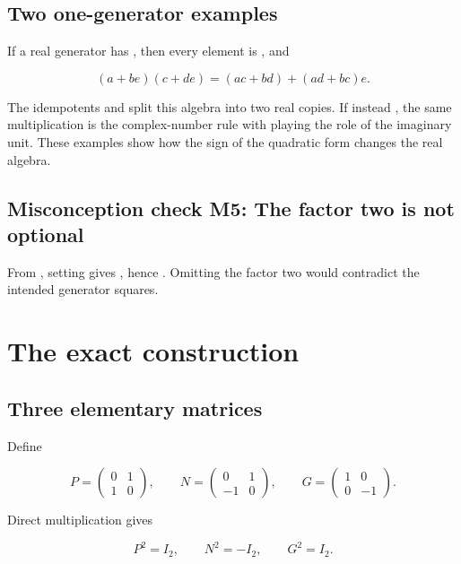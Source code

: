 \documentclass[11pt]{article}
\begin{document}
\subsection{Two one-generator examples}

If a real generator \texttt{} has \texttt{}, then every element is \texttt{}, and

\[
(a+be)(c+de)=(ac+bd)+(ad+bc)e.
\]

The idempotents \texttt{} and \texttt{} split this algebra into two real copies. If instead \texttt{}, the same multiplication is the complex-number rule with \texttt{} playing the role of the imaginary unit. These examples show how the sign of the quadratic form changes the real algebra.

\subsection{Misconception check M5: The factor two is not optional}

From \texttt{}, setting \texttt{} gives \texttt{}, hence \texttt{}. Omitting the factor two would contradict the intended generator squares.

\section{The exact \texttt{} construction}

\subsection{Three elementary matrices}

Define

\[
P=\begin{pmatrix}0&1\\1&0\end{pmatrix},
\qquad
N=\begin{pmatrix}0&1\\-1&0\end{pmatrix},
\qquad
G=\begin{pmatrix}1&0\\0&-1\end{pmatrix}.
\]

Direct multiplication gives

\[
P^2=I_2,\qquad N^2=-I_2,\qquad G^2=I_2.
\]
\end{document}
